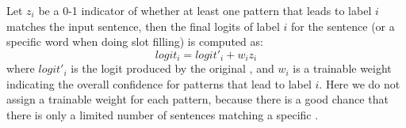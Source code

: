 Let $z_i$ be a 0-1 indicator of whether at least one \RE pattern that leads to label $i$ matches the input sentence, then the final logits of label $i$ for the sentence (or a specific word when doing slot filling) is computed as: 
\begin{equation}
logit_i = logit'_i + w_i z_i
\end{equation}
where $logit'_i$ is the logit produced by the original \NN, and $w_i$ is a trainable weight indicating the overall confidence for patterns that lead to label $i$. Here we do not assign a trainable weight for each pattern, because there is a good chance that there is only a limited number of sentences matching a specific \RE. 


